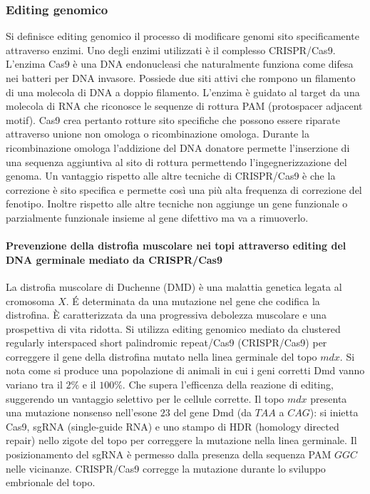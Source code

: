\subsubsection{Editing genomico}
Si definisce editing genomico il processo di modificare genomi sito specificamente attraverso enzimi. Uno degli enzimi utilizzati \`e il complesso CRISPR/Cas9. L'enzima Cas9 \`e una
DNA endonucleasi che naturalmente funziona come difesa nei batteri per DNA invasore. Possiede due siti attivi che rompono un filamento di una molecola di DNA a doppio filamento. 
L'enzima \`e guidato al target da una molecola di RNA che riconosce le sequenze di rottura PAM (protospacer adjacent motif). Cas9 crea pertanto rotture sito specifiche che possono 
essere riparate attraverso unione non omologa o ricombinazione omologa. Durante la ricombinazione omologa l'addizione del DNA donatore permette l'inserzione di una sequenza aggiuntiva
al sito di rottura permettendo l'ingegnerizzazione del genoma. Un vantaggio rispetto alle altre tecniche di CRISPR/Cas9 \`e che la correzione \`e sito specifica e permette cos\`i una
pi\`u alta frequenza di correzione del fenotipo. Inoltre rispetto alle altre tecniche non aggiunge un gene funzionale o parzialmente funzionale insieme al gene difettivo ma va a 
rimuoverlo. 
\paragraph{Prevenzione della distrofia muscolare nei topi attraverso editing del DNA germinale mediato da CRISPR/Cas9}
La distrofia muscolare di Duchenne (DMD) \`e una malattia genetica legata al cromosoma $X$. \'E determinata da una mutazione nel gene che codifica la distrofina. \`E caratterizzata
da una progressiva debolezza muscolare e una prospettiva di vita ridotta. Si utilizza editing genomico mediato da clustered regularly interspaced short palindromic repeat/Cas9 
(CRISPR/Cas9) per correggere il gene della distrofina mutato nella linea germinale del topo $mdx$. Si nota come si produce una popolazione di animali in cui i geni corretti Dmd vanno
variano tra il $2\%$ e il $100\%$. Che supera l'efficenza della reazione di editing, suggerendo un vantaggio selettivo per le cellule corrette. Il topo $mdx$ presenta una mutazione 
nonsenso nell'esone $23$ del gene Dmd (da $TAA$ a $CAG$): si inietta Cas9, sgRNA (single-guide RNA) e uno stampo di HDR (homology directed repair) nello zigote del topo per correggere la
mutazione nella linea germinale. Il posizionamento del sgRNA \`e permesso dalla presenza della sequenza PAM $GGC$ nelle vicinanze. CRISPR/Cas9 corregge la mutazione durante lo sviluppo 
embrionale del topo. 
